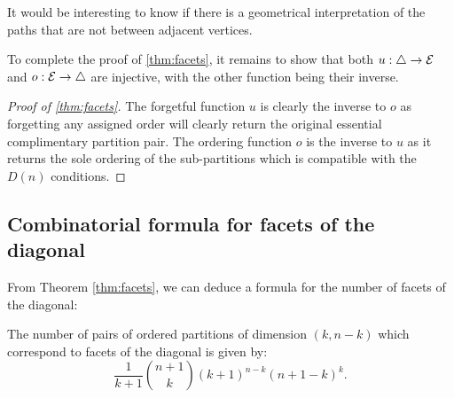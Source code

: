 \begin{rem}
    It would be interesting to know if there is a geometrical interpretation of the paths that are not between adjacent vertices. 
\end{rem}

To complete the proof of \cref{thm:facets}, it remains to show that both $u:\triangle \to \mathcal{E}$ and $o:\mathcal{E}\to \triangle$ are injective, with the other function being their inverse.

\begin{proof}[{Proof of \cref{thm:facets}}]
The forgetful function $u$ is clearly the inverse to $o$ as forgetting any assigned order will clearly return the original essential complimentary partition pair. 
The ordering function $o$ is the inverse to $u$ as it returns the sole ordering of the sub-partitions which is compatible with the $D(n)$ conditions.
\end{proof}

\subsection{Combinatorial formula for facets of the diagonal}

From Theorem \cref{thm:facets}, we can deduce a formula for the number of facets of the diagonal:

\begin{proposition}
The number of pairs of ordered partitions of dimension $(k,n-k)$ which correspond to facets of the diagonal is given by: 
\begin{equation}
\frac{1}{k+1}\binom{n+1}{k}(k+1)^{n-k}(n+1-k)^{k}.
\end{equation}
\end{proposition}


